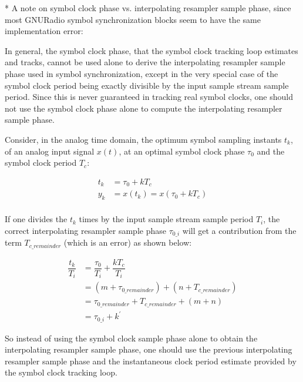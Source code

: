 \documentclass{article}
\begin{document}
\newpage

* A note on symbol clock phase vs. interpolating resampler sample phase,
since most GNURadio symbol synchronization blocks seem to have the same
implementation error:

In general, the symbol clock phase, that the symbol clock tracking loop
estimates and tracks, cannot be used alone to derive the interpolating resampler
sample phase used in symbol synchronization, except in the very special case of
the symbol clock period being exactly divisible by the input sample stream
sample period.  Since this is never guaranteed in tracking real symbol clocks,
one should not use the symbol clock phase alone to compute the interpolating
resampler sample phase.

Consider, in the analog time domain, the optimum symbol sampling instants
$t_{k}$, of an analog input signal $x(t)$, at an optimal symbol clock
phase $\tau_{0}$ and the symbol clock period $T_{c}$:

\begin{align*}
   t_{k} &= \tau_{0} + k T_{c} \\
   y_{k} &= x(t_{k}) = x(\tau_{0} + k T_{c}) \\
\end{align*}

If one divides the $t_{k}$ times by the input sample stream sample period
$T_{i}$, the correct interpolating resampler sample phase $\tau_{0\_i}$ will
get a contribution from the term $T_{c\_remainder}$ (which is an error) as shown
below:

\begin{align*}
   \dfrac{t_{k}}{T_{i}} &= \dfrac{\tau_{0}}{T_{i}} + \dfrac{k T_{c}}{T_{i}} \\
    &= (m + \tau_{0\_remainder}) + (n + T_{c\_remainder}) \\
    &= \tau_{0\_remainder} + T_{c\_remainder} + (m + n) \\
    &= \tau_{0\_i} + k^{\prime}
\end{align*}

So instead of using the symbol clock sample phase alone to obtain the
interpolating resampler sample phase, one should use the previous interpolating
resampler sample phase and the instantaneous clock period estimate provided by
the symbol clock tracking loop.
\end{document}
